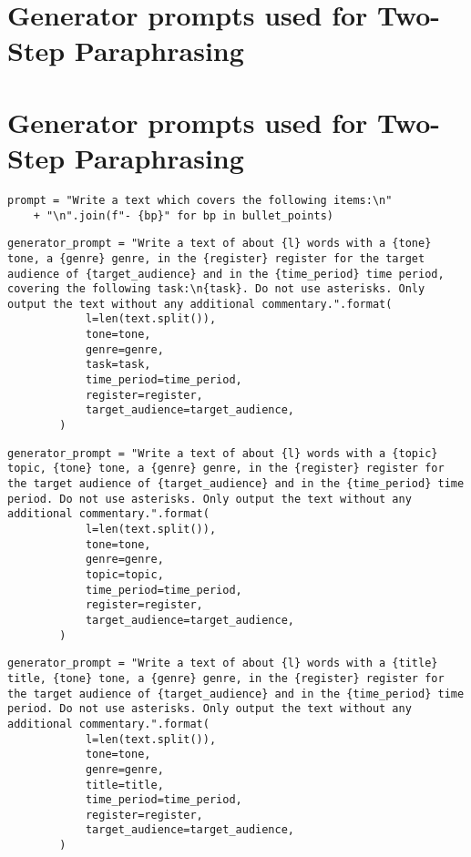 \section{Generator prompts used for Two-Step Paraphrasing}
\label{app:generator_prompts}

\section{Generator prompts used for Two-Step Paraphrasing}
\begin{verbatim}
prompt = "Write a text which covers the following items:\n" 
    + "\n".join(f"- {bp}" for bp in bullet_points)
\end{verbatim}

\begin{verbatim}
generator_prompt = "Write a text of about {l} words with a {tone} tone, a {genre} genre, in the {register} register for the target audience of {target_audience} and in the {time_period} time period, covering the following task:\n{task}. Do not use asterisks. Only output the text without any additional commentary.".format(
            l=len(text.split()),
            tone=tone,
            genre=genre,
            task=task,
            time_period=time_period,
            register=register,
            target_audience=target_audience,
        )
\end{verbatim}

\begin{verbatim}
generator_prompt = "Write a text of about {l} words with a {topic} topic, {tone} tone, a {genre} genre, in the {register} register for the target audience of {target_audience} and in the {time_period} time period. Do not use asterisks. Only output the text without any additional commentary.".format(
            l=len(text.split()),
            tone=tone,
            genre=genre,
            topic=topic,
            time_period=time_period,
            register=register,
            target_audience=target_audience,
        )
\end{verbatim}

\begin{verbatim}
generator_prompt = "Write a text of about {l} words with a {title} title, {tone} tone, a {genre} genre, in the {register} register for the target audience of {target_audience} and in the {time_period} time period. Do not use asterisks. Only output the text without any additional commentary.".format(
            l=len(text.split()),
            tone=tone,
            genre=genre,
            title=title,
            time_period=time_period,
            register=register,
            target_audience=target_audience,
        )
\end{verbatim}